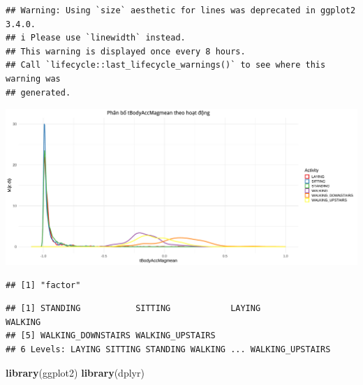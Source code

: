 \documentclass[
]{article}
\newenvironment{Shaded}{\begin{snugshade}}{\end{snugshade}}
\newcommand{\FunctionTok}[1]{\textcolor[rgb]{0.13,0.29,0.53}{\textbf{#1}}}
\newcommand{\NormalTok}[1]{#1}
\newcommand{\SpecialCharTok}[1]{\textcolor[rgb]{0.81,0.36,0.00}{\textbf{#1}}}
\begin{document}
\begin{verbatim}
## Warning: Using `size` aesthetic for lines was deprecated in ggplot2 3.4.0.
## i Please use `linewidth` instead.
## This warning is displayed once every 8 hours.
## Call `lifecycle::last_lifecycle_warnings()` to see where this warning was
## generated.
\end{verbatim}

\includegraphics{report_files/figure-latex/unnamed-chunk-14-1.pdf}

\begin{Shaded}
\end{Shaded}

\begin{verbatim}
## [1] "factor"
\end{verbatim}

\begin{Shaded}
\end{Shaded}

\begin{verbatim}
## [1] STANDING           SITTING            LAYING             WALKING           
## [5] WALKING_DOWNSTAIRS WALKING_UPSTAIRS  
## 6 Levels: LAYING SITTING STANDING WALKING ... WALKING_UPSTAIRS
\end{verbatim}

\begin{Shaded}
\begin{Highlighting}[]
\FunctionTok{library}\NormalTok{(ggplot2)}
\FunctionTok{library}\NormalTok{(dplyr)}
\end{Highlighting}
\end{Shaded}
\end{document}
